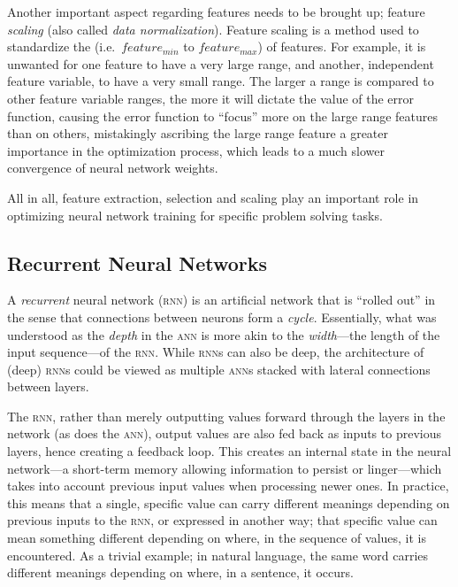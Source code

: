 \begin{multicols}{2}
Another important aspect regarding features needs to be brought up; feature
\textit{scaling} (also called \textit{data normalization}).  Feature scaling is
a method used to standardize the  (i.e.\ $\mathit{feature_{min}}$ to
$\mathit{feature_{max}}$) of features.  For example, it is
unwanted for one feature to have a very large range, and another, independent
feature variable, to have a very small range.  The larger a range is compared to
other feature variable ranges, the more it will dictate the value of the error
function, causing the error function to ``focus'' more on the large range
features than on others, mistakingly ascribing the large range feature a greater
importance in the optimization process, which leads to a much slower convergence
of neural network weights.

All in all, feature extraction, selection and scaling play an important role in
optimizing neural network training for specific problem solving tasks.

\subsection{Recurrent Neural Networks}

A \textit{recurrent} neural network (\textsc{rnn}) is an artificial network that
is ``rolled out'' in the sense that connections between neurons form a
\textit{cycle}.  Essentially, what was understood as the \textit{depth} in the
\textsc{ann} is more akin to the \textit{width}---the length of the input
sequence---of the \textsc{rnn}.  While \textsc{rnn}s can also be deep, the
architecture of (deep) \textsc{rnn}s could be viewed as multiple \textsc{ann}s
stacked with lateral connections between layers.

The \textsc{rnn}, rather than merely outputting values forward through the
layers in the network (as does the \textsc{ann}), output values are also fed
back as inputs to previous layers, hence creating a feedback loop.  This creates
an internal state in the neural network---a short-term memory allowing
information to persist or linger---which takes into account previous input
values when processing newer ones.  In practice, this means that a single,
specific value can carry different meanings depending on previous inputs to the
\textsc{rnn}, or expressed in another way; that specific value can mean
something different depending on where, in the sequence of values, it is
encountered.  As a trivial example; in natural language, the same word carries
different meanings depending on where, in a sentence, it occurs.


\end{multicols}
